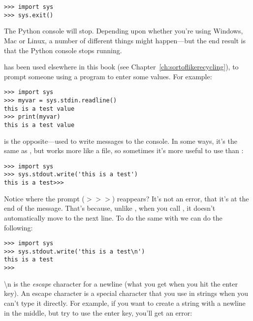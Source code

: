 \begin{listingignore}
\begin{verbatim}
>>> import sys
>>> sys.exit()
\end{verbatim}
\end{listingignore}

The Python console will stop. Depending upon whether you're using Windows, Mac or Linux, a number of different things might happen---but the end result is that the Python console stops running.

 has been used elsewhere in this book (see Chapter~\ref{ch:sortoflikerecycling}), to prompt someone using a program to enter some values. For example:

\begin{listingignore}
\begin{verbatim}
>>> import sys
>>> myvar = sys.stdin.readline()
this is a test value
>>> print(myvar)
this is a test value
\end{verbatim}
\end{listingignore}

 is the opposite---used to write messages to the console. In some ways, it's the same as , but works more like a file, so sometimes it's more useful to use  than :

\begin{listingignore}
\begin{verbatim}
>>> import sys
>>> sys.stdout.write('this is a test')
this is a test>>>
\end{verbatim}
\end{listingignore}

Notice where the prompt ($>>>$) reappears?  It's not an error, that it's at the end of the message.  That's because, unlike , when you call , it doesn't automatically move to the next line. To do the same with  we can do the following:

\begin{listingignore}
\begin{verbatim}
>>> import sys
>>> sys.stdout.write('this is a test\n')
this is a test
>>>
\end{verbatim}
\end{listingignore}

\noindent
{\textbackslash}n is the \emph{escape} character for a newline (what you get when you hit the enter key).  An escape character is a special character that you use in strings when you can't type it directly. For example, if you want to create a string with a newline in the middle, but try to use the enter key, you'll get an error:

